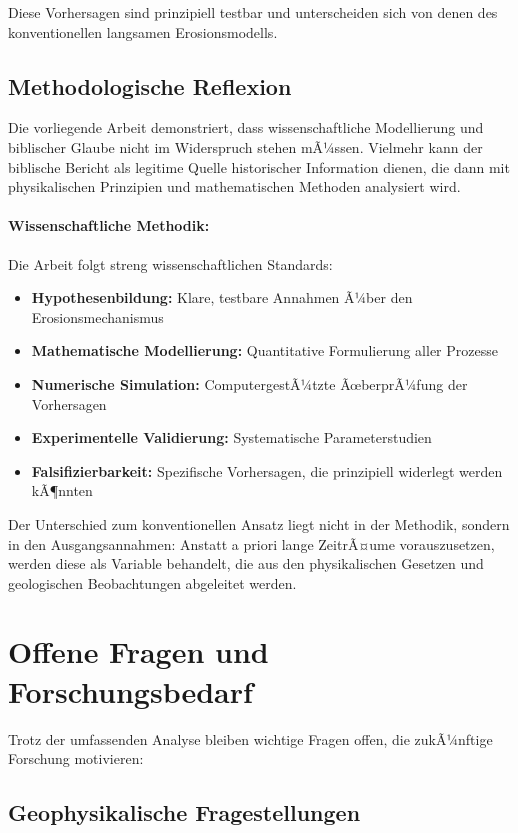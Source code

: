 ﻿\documentclass[12pt,a4paper]{report}
\begin{document}
Diese Vorhersagen sind prinzipiell testbar und unterscheiden sich von denen des konventionellen langsamen Erosionsmodells.

\subsection{Methodologische Reflexion}

Die vorliegende Arbeit demonstriert, dass wissenschaftliche Modellierung und biblischer Glaube nicht im Widerspruch stehen mÃ¼ssen. Vielmehr kann der biblische Bericht als legitime Quelle historischer Information dienen, die dann mit physikalischen Prinzipien und mathematischen Methoden analysiert wird.

\paragraph{Wissenschaftliche Methodik:}
Die Arbeit folgt streng wissenschaftlichen Standards:
\begin{itemize}
	\item \textbf{Hypothesenbildung:} Klare, testbare Annahmen Ã¼ber den Erosionsmechanismus
	\item \textbf{Mathematische Modellierung:} Quantitative Formulierung aller Prozesse
	\item \textbf{Numerische Simulation:} ComputergestÃ¼tzte ÃœberprÃ¼fung der Vorhersagen
	\item \textbf{Experimentelle Validierung:} Systematische Parameterstudien
	\item \textbf{Falsifizierbarkeit:} Spezifische Vorhersagen, die prinzipiell widerlegt werden kÃ¶nnten
\end{itemize}

Der Unterschied zum konventionellen Ansatz liegt nicht in der Methodik, sondern in den Ausgangsannahmen: Anstatt a priori lange ZeitrÃ¤ume vorauszusetzen, werden diese als Variable behandelt, die aus den physikalischen Gesetzen und geologischen Beobachtungen abgeleitet werden.

\section{Offene Fragen und Forschungsbedarf}

Trotz der umfassenden Analyse bleiben wichtige Fragen offen, die zukÃ¼nftige Forschung motivieren:

\subsection{Geophysikalische Fragestellungen}
\end{document}
